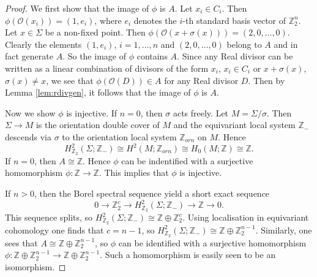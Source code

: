 \documentclass[10pt,a4paper]{amsart}
\begin{document}
\begin{proof}
We first show that the image of $\phi$ is $A$. Let $x_i \in C_i$. Then $\phi( \mathcal{O}(x_i) ) = (1 , e_i )$, where $e_i$ denotes the $i$-th standard basis vector of $\mathbb{Z}_2^n$. Let $x \in \Sigma$ be a non-fixed point. Then $\phi( \mathcal{O}(x+\sigma(x)) ) = (2 , 0 , \dots , 0)$. Clearly the elements $(1 , e_i)$, $i = 1, \dots , n$ and $(2 , 0 , \dots , 0)$ belong to $A$ and in fact generate $A$. So the image of $\phi$ contains $A$. Since any Real divisor can be written as a linear combination of divisors of the form $x_i$, $x_i \in C_i$ or $x + \sigma(x)$, $\sigma(x) \neq x$, we see that $\phi( \mathcal{O}(D) ) \in A$ for any Real divisor $D$. Then by Lemma \ref{lem:rdivgen}, it follows that the image of $\phi$ is $A$.

Now we show $\phi$ is injective. If $n = 0$, then $\sigma$ acts freely. Let $M = \Sigma/\sigma$. Then $\Sigma \to M$ is the orientation double cover of $M$ and the equivariant local system $\mathbb{Z}_-$ descends via $\sigma$ to the orientation local system $\mathbb{Z}_{orn}$ on $M$. Hence
\[
H^2_{\mathbb{Z}_2}(\Sigma ; \mathbb{Z}_-) \cong H^2(M ; \mathbb{Z}_{orn}) \cong H_0(M ; \mathbb{Z}) \cong \mathbb{Z}.
\]
If $n=0$, then $A \cong \mathbb{Z}$. Hence $\phi$ can be indentified with a surjective homomorphism $\phi : \mathbb{Z} \to \mathbb{Z}$. This implies that $\phi$ is injective.

If $n > 0$, then the Borel spectral sequence yield a short exact sequence
\[
0 \to \mathbb{Z}_2^c \to H^2_{\mathbb{Z}_2}(\Sigma ; \mathbb{Z}_-) \to \mathbb{Z} \to 0.
\]
This sequence splits, so $H^2_{\mathbb{Z}_2}(\Sigma ; \mathbb{Z}_-) \cong \mathbb{Z} \oplus \mathbb{Z}_2^c$. Using localisation in equivariant cohomology one finds that $c = n-1$, so $H^2_{\mathbb{Z}_2}(\Sigma ; \mathbb{Z}_-) \cong \mathbb{Z} \oplus \mathbb{Z}_2^{n-1}$. Similarly, one sees that $A \cong \mathbb{Z} \oplus \mathbb{Z}_2^{n-1}$, so $\phi$ can be identified with a surjective homomorphism $\phi : \mathbb{Z} \oplus \mathbb{Z}_2^{n-1} \to \mathbb{Z} \oplus \mathbb{Z}_2^{n-1}$. Such a homomorphism is easily seen to be an isomorphism.
\end{proof}
\end{document}
